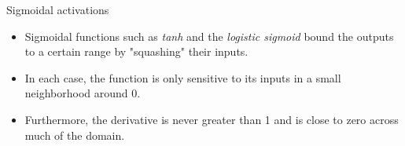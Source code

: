 \begin{frame} {Sigmoidal activations}
  \begin{itemize}
    \item Sigmoidal functions such as \emph{tanh} and the \emph{logistic sigmoid} bound the outputs to a certain range by "squashing" their inputs.
    \begin{figure}
    \centering
    \end{figure}
    \item In each case, the function is only sensitive to its inputs in a small neighborhood around $0$.
    \item Furthermore, the derivative is never greater than 1 and is close to zero across much of the domain.
  \end{itemize}
\end{frame}


